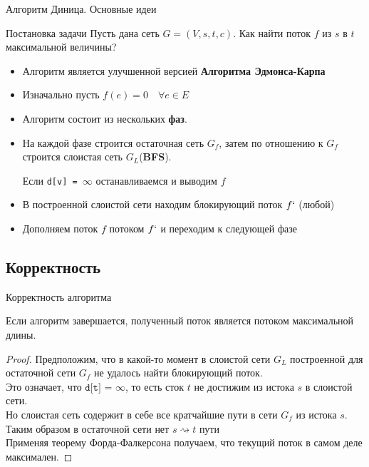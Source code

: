 \documentclass{beamer}
\begin{document}
\begin{frame}{Алгоритм Диница. Основные идеи}
    \begin{block}{Постановка задачи}
    Пусть дана сеть $G = (V, s, t, c)$. Как найти поток $f$ из $s$ в $t$ максимальной величины?
    \end{block}
    \begin{itemize}
        \item {
        Алгоритм является улучшенной версией \textbf{Алгоритма Эдмонса-Карпа}
        \pause
        }
        \item {
        Изначально пусть $f(e) = 0 \quad \forall e \in E$
        \pause
        }
        \item {
        Алгоритм состоит из нескольких \textbf{фаз}.
        \pause
        }
        \item {
        На каждой фазе строится остаточная сеть \textbf{$G_f$}, затем по отношению к $G_f$ строится слоистая сеть $G_{L}$(\textbf{BFS}). 
        
        Если \texttt{d[v] = $\infty$} останавливаемся и выводим $f$
        \pause
        }
        \item {
        В построенной слоистой сети находим блокирующий поток $f`$ (любой)
        \pause
        }
        \item {
        Дополняем поток $f$ потоком $f`$ и переходим к следующей фазе
        }
    \end{itemize}
\end{frame}

\subsection{Корректность}
\begin{frame}{Корректность алгоритма}
    \begin{theorem}
        Если алгоритм завершается, полученный поток является потоком максимальной длины.
    \end{theorem}
    \pause
    \begin{proof}
        Предположим, что в какой-то момент в слоистой сети $G_{L}$ построенной для остаточной сети $G_f$ не удалось найти блокирующий поток.\\
        \pause
        Это означает, что $\texttt{d[t] = } \infty$, то есть сток $t$ не достижим из истока $s$ в слоистой сети.\\
        \pause
        Но слоистая сеть содержит в себе все кратчайшие пути в сети $G_{f}$ из истока $s$.\\
        \pause
        Таким образом в остаточной сети нет 
        $s \rightsquigarrow t$ пути\\
        \pause
        Применяя теорему Форда-Фалкерсона получаем, что текущий поток в самом деле максимален.
    \end{proof}
\end{frame}
\end{document}
